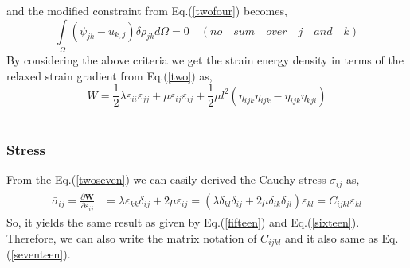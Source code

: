 \documentclass[12pt]{article}
\begin{document}
and the modified constraint from Eq.(\ref{twofour}) becomes,
\begin{equation}\label{twosix}
\int\limits_\Omega\! (\psi_{jk} - u_{k,j})\delta\rho_{jk}  d\Omega = 0  \quad (no \quad sum\quad over \quad j \quad and \quad k)
\end{equation} 
By considering the above criteria we get the strain energy density in terms of the relaxed strain gradient from Eq.(\ref{two}) as,
\begin{equation}\label{twoseven}
W = \frac{1}{2}\lambda\varepsilon_{ii}\varepsilon_{jj}+\mu\varepsilon_{ij}\varepsilon_{ij} +\frac{1}{2}\mu l^2 ( \eta_{ijk}\eta_{ijk} - \eta_{ijk}\eta_{kji} )
\end{equation}
\\
\subsubsection{ Stress}
From the Eq.(\ref{twoseven}) we can easily derived the Cauchy stress $\sigma_{ij}$ as,
\begin{equation}\label{twoeight}
\begin{aligned}
\bar{\sigma}_{ij} = \frac{\partial \tilde{\mathbf{W}} }{\partial \varepsilon_{ij}} &=  \lambda\varepsilon_{kk}\delta_{ij} +2\mu\varepsilon_{ij} = (\lambda\delta_{kl}\delta_{ij} + 2\mu\delta_{ik}\delta_{jl})\varepsilon_{kl} = C_{ijkl} \varepsilon_{kl}
\end{aligned}
\end{equation} 
So, it yields the same result as given by Eq.(\ref{fifteen}) and Eq.(\ref{sixteen}). Therefore, we can also write the matrix notation of $ C_{ijkl} $ and it also same as Eq.(\ref{seventeen}).
\end{document}

